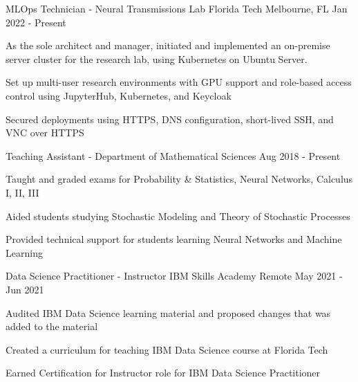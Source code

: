 \begin{cventries}
	\cventry
	{MLOps Technician - Neural Transmissions Lab}
	{Florida Tech}
	{Melbourne, FL}
	{Jan 2022 - Present}
	{\begin{cvitems}
			\item {As the sole architect and manager, initiated and implemented an on-premise server cluster for the research lab, using Kubernetes on Ubuntu Server.}
			\item {Set up multi-user research environments with GPU support and role-based access control using JupyterHub, Kubernetes, and Keycloak}
			\item {Secured deployments using HTTPS, DNS configuration, short-lived SSH, and VNC over HTTPS}
		\end{cvitems}}

	\cventry
	{Teaching Assistant - Department of Mathematical Sciences}
	{}
	{}
	{Aug 2018 - Present}
	{\begin{cvitems}
			\item {Taught and graded exams for Probability \& Statistics, Neural Networks, Calculus I, II, III}
			\item {Aided students studying Stochastic Modeling and Theory of Stochastic Processes}
			\item {Provided technical support for students learning Neural Networks and Machine Learning}
		\end{cvitems}}

	\cventry
	{Data Science Practitioner - Instructor}
	{IBM Skills Academy}
	{Remote}
	{May 2021 - Jun 2021}
	{\begin{cvitems}
			\item {Audited IBM Data Science learning material and proposed changes that was added to the material}
			\item {Created a curriculum for teaching IBM Data Science course at Florida Tech}
			\item {Earned Certification for Instructor role for IBM Data Science Practitioner}
		\end{cvitems}}

\end{cventries}